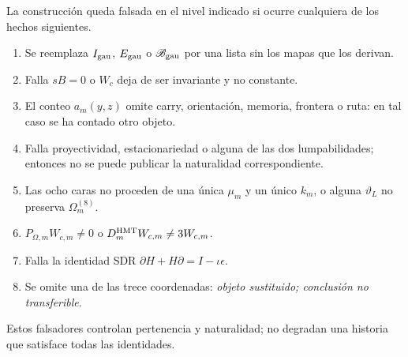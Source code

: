 \begin{ablation}
\label{abl:gauint-falsadores}
La construcción queda falsada en el nivel indicado si ocurre cualquiera de
los hechos siguientes.
\begin{enumerate}
 \item Se reemplaza \(I_{\rm gau}\), \(E_{\rm gau}\) o
 \(\mathscr B_{\rm gau}\) por una lista sin los mapas que los derivan.
 \item Falla \(sB=0\) o \(W_c\) deja de ser invariante y no constante.
 \item El conteo \(a_m(y,z)\) omite carry, orientación, memoria, frontera o
 ruta: en tal caso se ha contado otro objeto.
 \item Falla proyectividad, estacionariedad o alguna de las dos
 lumpabilidades; entonces no se puede publicar la naturalidad correspondiente.
 \item Las ocho caras no proceden de una única \(\mu_m\) y un único
 \(k_m\), o alguna \(\vartheta_L\) no preserva \(\Omega_m^{(8)}\).
 \item \(P_{\Omega,m}W_{c,m}\ne0\) o
 \(D_m^{\rm HMT}W_{c,m}\ne3W_{c,m}\).
 \item Falla la identidad SDR \(\partial H+H\partial=I-\iota\epsilon\).
 \item Se omite una de las trece coordenadas: \emph{objeto sustituido;
 conclusión no transferible}.
\end{enumerate}
Estos falsadores controlan pertenencia y naturalidad; no degradan una
historia que satisface todas las identidades.
\end{ablation}
\fi
